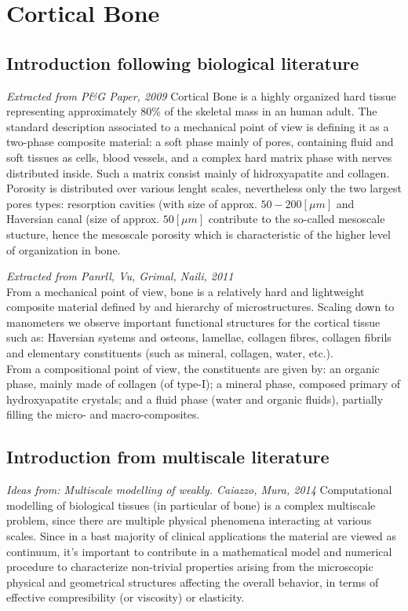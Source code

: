 \chapter{Cortical Bone}

\section{Introduction following biological literature}
\textit{Extracted from P\&G Paper, 2009} Cortical Bone is a highly organized hard tissue representing approximately 80\% of the skeletal mass in an human adult. The standard description associated to a mechanical point of view is defining it as a two-phase composite material: a soft phase mainly of pores, containing fluid and soft tissues as cells, blood vessels, and a complex hard matrix phase with nerves distributed inside. Such a matrix consist mainly of hidroxyapatite and collagen. Porosity is distributed over various lenght scales, nevertheless only the two largest pores types: resorption cavities (with size of approx. $50-200 [\mu m]$ and Haversian canal (size of approx. $50 [ \mu m ]$ contribute to the so-called mesoscale stucture, hence the mesoscale porosity which is characteristic of the higher level of organization in bone. 

\textit{Extracted from Panrll, Vu, Grimal, Naili, 2011} \\
From a mechanical point of view, bone is a relatively hard and lightweight composite material defined by and hierarchy of microstructures. Scaling down to manometers we observe important functional structures for the cortical tissue such as: Haversian systems and osteons, lamellae, collagen fibres, collagen fibrils and elementary constituents (such as mineral, collagen, water, etc.).\\
From a compositional point of view, the constituents are given by: an organic phase, mainly made of collagen (of type-I); a mineral phase, composed primary of hydroxyapatite crystals; and a fluid phase (water and organic fluids), partially filling the micro- and macro-composites.

\section{Introduction from multiscale literature}
\textit{Ideas from: Multiscale modelling of weakly. Caiazzo, Mura, 2014}
Computational modelling of biological tissues (in particular of bone) is a complex multiscale problem, since there are multiple physical phenomena interacting at various scales. Since in a bast majority of clinical applications the material are viewed as continuum, it's important to contribute in a mathematical model and numerical procedure to characterize non-trivial properties arising from the microscopic physical and geometrical structures affecting the overall behavior, in terms of effective compresibility (or viscosity) or elasticity. 

